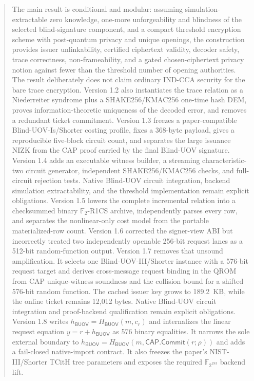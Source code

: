 \documentclass[11pt]{article}
\newcommand{\BUOV}{\mathsf{BUOV}}
\begin{document}
\begin{abstract}
The main result is conditional and modular: assuming simulation-extractable
zero knowledge, one-more unforgeability and blindness of the selected
blind-signature component, and a compact threshold encryption scheme with post-quantum
privacy and unique openings, the construction provides issuer unlinkability,
certified ciphertext validity, decoder safety, trace correctness,
non-frameability, and a gated chosen-ciphertext privacy notion against fewer than
the threshold number of opening authorities.  The result deliberately does not
claim ordinary IND-CCA security for the bare trace encryption.  Version 1.2
also instantiates the trace relation as a Niederreiter syndrome plus a
SHAKE256/KMAC256 one-time hash DEM, proves information-theoretic uniqueness of
the decoded error, and removes a redundant ticket commitment.  Version 1.3
freezes a paper-compatible Blind-UOV-Is/Shorter costing profile, fixes a
368-byte payload, gives a reproducible five-block circuit count, and separates
the large issuance NIZK from the CAP proof carried by the final Blind-UOV
signature.  Version 1.4 adds an executable witness builder, a streaming
characteristic-two circuit generator, independent SHAKE256/KMAC256 checks, and
full-circuit rejection tests.  Native Blind-UOV circuit integration, backend
simulation extractability, and the threshold implementation remain explicit
obligations.  Version 1.5 lowers the complete incremental relation into a
checksummed binary $\mathbb F_2$-R1CS archive, independently parses every row,
and separates the nonlinear-only cost model from the portable materialized-row
count.  Version 1.6 corrected the signer-view ABI but incorrectly treated two
independently openable 256-bit request lanes as a 512-bit random-function
output.  Version 1.7 removes that unsound amplification.  It selects one
Blind-UOV-III/Shorter instance with a 576-bit request target and derives
cross-message request binding in the QROM from CAP unique-witness soundness and
the collision bound for a shifted 576-bit random function.  The cached issuer
key grows to 189.2~KB, while the online ticket remains 12,012 bytes.  Native
Blind-UOV circuit integration and proof-backend qualification remain explicit
obligations.  Version 1.8 writes $h_{\BUOV}=H_{\BUOV}(m,c_r)$ and internalizes
the linear request equation $y=r+h_{\BUOV}$ as 576 binary equalities.  It
narrows the sole external boundary to
$h_{\BUOV}=H_{\BUOV}(m,\mathsf{CAP.Commit}(r;\rho))$ and adds a fail-closed
native-import contract.  It also freezes the paper's NIST-III/Shorter TCitH
tree parameters and exposes the required $\mathbb F_{2^{193}}$ backend lift.

\end{abstract}
\end{document}

